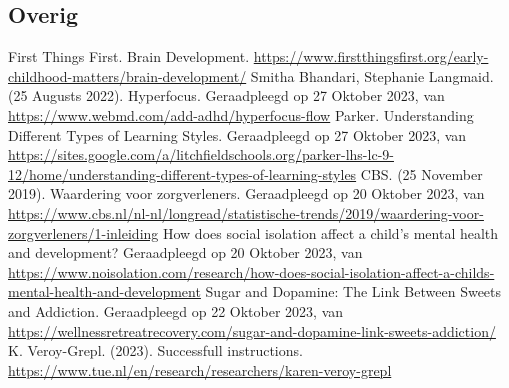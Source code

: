 \begin{thebibliography}{9}
        \item[\bigskip\subsection*{Overig}]
                First Things First. Brain Development. \url{https://www.firstthingsfirst.org/early-childhood-matters/brain-development/}
                Smitha Bhandari, Stephanie Langmaid. (25 Augusts 2022). Hyperfocus. Geraadpleegd op 27 Oktober 2023, van \url{https://www.webmd.com/add-adhd/hyperfocus-flow}
                Parker. Understanding Different Types of Learning Styles. Geraadpleegd op 27 Oktober 2023, van \url{https://sites.google.com/a/litchfieldschools.org/parker-lhs-lc-9-12/home/understanding-different-types-of-learning-styles}
                CBS. (25 November 2019). Waardering voor zorgverleners. Geraadpleegd op 20 Oktober 2023, van \url{https://www.cbs.nl/nl-nl/longread/statistische-trends/2019/waardering-voor-zorgverleners/1-inleiding}
                How does social isolation affect a child’s mental health and development? Geraadpleegd op 20 Oktober 2023, van \url{https://www.noisolation.com/research/how-does-social-isolation-affect-a-childs-mental-health-and-development}
                Sugar and Dopamine: The Link Between Sweets and Addiction. Geraadpleegd op 22 Oktober 2023, van \url{https://wellnessretreatrecovery.com/sugar-and-dopamine-link-sweets-addiction/}
                K. Veroy-Grepl. (2023). Successfull instructions. \url{https://www.tue.nl/en/research/researchers/karen-veroy-grepl}
    \end{thebibliography}
